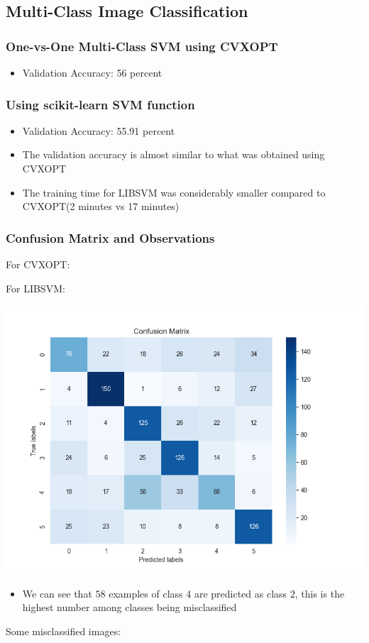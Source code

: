 \documentclass[12pt,a4paper]{article}
\begin{document}
\subsection{Multi-Class Image Classification}
\subsubsection{One-vs-One Multi-Class SVM using CVXOPT}
\begin{itemize}
    \item Validation Accuracy: 56 percent
\end{itemize}

\subsubsection{Using scikit-learn SVM function}
\begin{itemize}
    \item Validation Accuracy: 55.91 percent
    \item The validation accuracy is almost similar to what was obtained using CVXOPT
    \item The training time for LIBSVM was considerably smaller compared to CVXOPT(2 minutes vs 17 minutes)
\end{itemize}

\subsubsection{Confusion Matrix and Observations}
For CVXOPT:



For LIBSVM:

\includegraphics[width=\textwidth]{Assignment 2/q2/confusion_matrix libsvm.png}
\begin{itemize}
    \item We can see that 58 examples of class 4 are predicted as class 2, this is the highest number among classes being misclassified
\end{itemize}
Some misclassified images:
\end{document}
